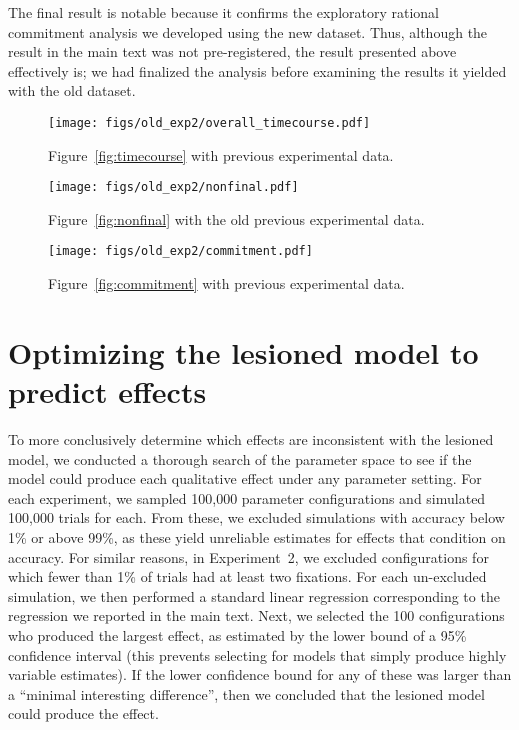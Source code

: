The final result is notable because it confirms the exploratory rational commitment analysis we developed using the new dataset. Thus, although the result in the main text was not pre-registered, the result presented above effectively is; we had finalized the analysis before examining the results it yielded with the old dataset.

\begin{figure*}[ht]
  \centering
  \texttt{[image: figs/old\_exp2/overall\_timecourse.pdf]}
  \caption{Figure~\ref{fig:timecourse} with previous experimental data.
    \label{fig:old_timecourse}
  }
\end{figure*}

\begin{figure*}[t]
  \texttt{[image: figs/old\_exp2/nonfinal.pdf]}
  \caption{Figure~\ref{fig:nonfinal} with the old previous experimental data.
    \label{fig:old_nonfinal}
}
\end{figure*}

\begin{figure*}[t]
  \texttt{[image: figs/old\_exp2/commitment.pdf]}
  \caption{Figure~\ref{fig:commitment} with previous experimental data.
    \label{fig:old_commitment}
}
\end{figure*}

\section{Optimizing the lesioned model to predict effects}\label{app:lesion-search}

To more conclusively determine which effects are inconsistent with the lesioned model, we conducted a thorough search of the parameter space to see if the model could produce each qualitative effect under any parameter setting. For each experiment, we sampled 100,000 parameter configurations and simulated 100,000 trials for each. From these, we excluded simulations with accuracy below 1\% or above 99\%, as these yield unreliable estimates for effects that condition on accuracy. For similar reasons, in Experiment~2, we excluded configurations for which fewer than 1\% of trials had at least two fixations. For each un-excluded simulation, we then performed a standard linear regression corresponding to the regression we reported in the main text. Next, we selected the 100 configurations who produced the largest effect, as estimated by the lower bound of a 95\% confidence interval (this prevents selecting for models that simply produce highly variable estimates). If the lower confidence bound for any of these was larger than a ``minimal interesting difference'', then we concluded that the lesioned model could produce the effect.

